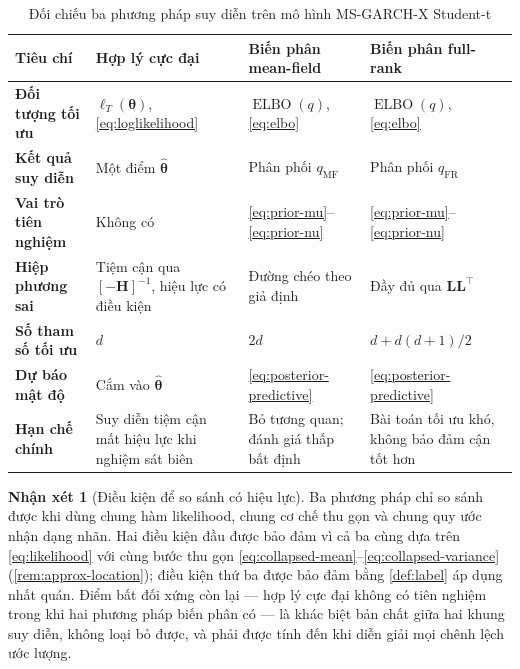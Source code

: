 \documentclass[12pt,a4paper]{article}
\numberwithin{equation}{section}
\theoremstyle{definition}
\newtheorem{remark}{Nhận xét}[section]
\newcommand{\ELBO}{\operatorname{ELBO}}
\newcommand{\Param}{\symbf{\theta}}
\begin{document}
\begin{table}[H]
\centering\footnotesize
\setlength{\tabcolsep}{4pt}
\caption{Đối chiếu ba phương pháp suy diễn trên mô hình MS-GARCH-X Student-t}
\label{tab:comparison}
\begin{tabularx}{\textwidth}{>{\raggedright\arraybackslash\bfseries}p{2.5cm} Y Y Y}
\toprule
\textbf{Tiêu chí} & \textbf{Hợp lý cực đại} & \textbf{Biến phân mean-field} & \textbf{Biến phân full-rank} \\
\midrule
Đối tượng tối ưu & $\ell_T(\Param)$, \eqref{eq:loglikelihood} & $\ELBO(q)$, \eqref{eq:elbo} & $\ELBO(q)$, \eqref{eq:elbo} \\
\addlinespace[0.2em]
Kết quả suy diễn & Một điểm $\hat{\Param}$ & Phân phối $q_{\mathrm{MF}}$ & Phân phối $q_{\mathrm{FR}}$ \\
\addlinespace[0.2em]
Vai trò tiên nghiệm & Không có & \eqref{eq:prior-mu}--\eqref{eq:prior-nu} & \eqref{eq:prior-mu}--\eqref{eq:prior-nu} \\
\addlinespace[0.2em]
Hiệp phương sai & Tiệm cận qua $[-\symbf H]^{-1}$, hiệu lực có điều kiện & Đường chéo theo giả định & Đầy đủ qua $\symbf L\symbf L^{\top}$ \\
\addlinespace[0.2em]
Số tham số tối ưu & $d$ & $2d$ & $d+d(d+1)/2$ \\
\addlinespace[0.2em]
Dự báo mật độ & Cắm vào $\hat{\Param}$ & \eqref{eq:posterior-predictive} & \eqref{eq:posterior-predictive} \\
\addlinespace[0.2em]
Hạn chế chính & Suy diễn tiệm cận mất hiệu lực khi nghiệm sát biên & Bỏ tương quan; đánh giá thấp bất định & Bài toán tối ưu khó, không bảo đảm cận tốt hơn \\
\bottomrule
\end{tabularx}
\end{table}

\begin{remark}[Điều kiện để so sánh có hiệu lực]\label{rem:comparability}
Ba phương pháp chỉ so sánh được khi dùng chung hàm likelihood, chung cơ chế thu gọn và
chung quy ước nhận dạng nhãn. Hai điều kiện đầu được bảo đảm vì cả ba cùng dựa trên
\eqref{eq:likelihood} với cùng bước thu gọn
\eqref{eq:collapsed-mean}--\eqref{eq:collapsed-variance} (\cref{rem:approx-location});
điều kiện thứ ba được bảo đảm bằng \cref{def:label} áp dụng nhất quán. Điểm bất đối xứng
còn lại --- hợp lý cực đại không có tiên nghiệm trong khi hai phương pháp biến phân có ---
là khác biệt bản chất giữa hai khung suy diễn, không loại bỏ được, và phải được tính đến
khi diễn giải mọi chênh lệch ước lượng.
\end{remark}
\end{document}
